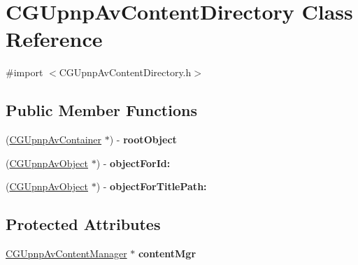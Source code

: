 \hypertarget{interface_c_g_upnp_av_content_directory}{\section{C\-G\-Upnp\-Av\-Content\-Directory Class Reference}
\label{interface_c_g_upnp_av_content_directory}
}


{\ttfamily \#import $<$C\-G\-Upnp\-Av\-Content\-Directory.\-h$>$}

\subsection*{Public Member Functions}
\begin{DoxyCompactItemize}
\item 
\hypertarget{interface_c_g_upnp_av_content_directory_aee56891ad4f5b4ec6e045e74804f3cc1}{(\hyperlink{interface_c_g_upnp_av_container}{C\-G\-Upnp\-Av\-Container} $\ast$) -\/ {\bfseries root\-Object}}\label{interface_c_g_upnp_av_content_directory_aee56891ad4f5b4ec6e045e74804f3cc1}

\item 
\hypertarget{interface_c_g_upnp_av_content_directory_a018b3703a323e863e295b82ab890313a}{(\hyperlink{interface_c_g_upnp_av_object}{C\-G\-Upnp\-Av\-Object} $\ast$) -\/ {\bfseries object\-For\-Id\-:}}\label{interface_c_g_upnp_av_content_directory_a018b3703a323e863e295b82ab890313a}

\item 
\hypertarget{interface_c_g_upnp_av_content_directory_a0e3a6c2a7f3205eb12b9d75630ed43c8}{(\hyperlink{interface_c_g_upnp_av_object}{C\-G\-Upnp\-Av\-Object} $\ast$) -\/ {\bfseries object\-For\-Title\-Path\-:}}\label{interface_c_g_upnp_av_content_directory_a0e3a6c2a7f3205eb12b9d75630ed43c8}

\end{DoxyCompactItemize}
\subsection*{Protected Attributes}
\begin{DoxyCompactItemize}
\item 
\hypertarget{interface_c_g_upnp_av_content_directory_a9fe9344396171d74aab26a31043c60e0}{\hyperlink{interface_c_g_upnp_av_content_manager}{C\-G\-Upnp\-Av\-Content\-Manager} $\ast$ {\bfseries content\-Mgr}}\label{interface_c_g_upnp_av_content_directory_a9fe9344396171d74aab26a31043c60e0}

\end{DoxyCompactItemize}


